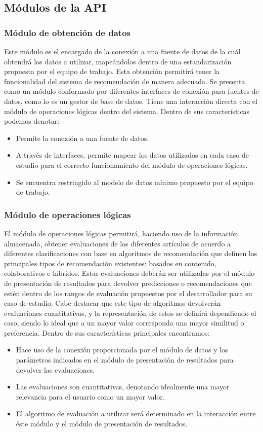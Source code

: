 \subsection{Módulos de la API}
  \subsubsection{Módulo de obtención de datos}
    Este módulo es el encargado de la conexión a una fuente de datos de la cuál obtendrá los datos a utilizar, mapeándolos dentro de una estandarización propuesta por el equipo de trabajo. Esta obtención permitirá tener la funcionalidad del sistema de recomendación de manera adecuada. 
    Se presenta como un módulo conformado por diferentes interfaces de conexión para fuentes de datos, como lo es un gestor de base de datos. Tiene una interacción directa con el módulo de operaciones lógicas dentro del sistema.
    Dentro de sus características podemos denotar:
    \begin{itemize}
      \item Permite la conexión a una fuente de datos.
      \item A través de interfaces, permite mapear los datos utilizados en cada caso de estudio para el correcto funcionamiento del módulo de operaciones lógicas.
      \item Se encuentra restringido al modelo de datos mínimo propuesto por el equipo de trabajo.
    \end{itemize}

  \subsubsection{Módulo de operaciones lógicas}
    El módulo de operaciones lógicas permitirá, haciendo uso de la información almacenada, obtener evaluaciones de los diferentes artículos de acuerdo a diferentes clasificaciones con base en algoritmos de recomendación que definen los principales tipos de recomendación existentes: basados en contenido, colaborativos e híbridos. Estas evaluaciones deberán ser utilizadas por el módulo de presentación de resultados para devolver predicciones o recomendaciones que estén dentro de los rangos de evaluación propuestos por el desarrollador para su caso de estudio. Cabe destacar que este tipo de algoritmos devolverán evaluaciones cuantitativas, y la representación de estos se definirá dependiendo el caso, siendo lo ideal que a un mayor valor corresponda una mayor similitud o preferencia. Dentro de sus características principales encontramos:
    \begin{itemize}
      \item Hace uso de la conexión proporcionada por el módulo de datos y los parámetros indicados en el módulo de presentación de resultados para devolver las evaluaciones.
      \item Las evaluaciones son cuantitativas, denotando idealmente una mayor relevancia para el usuario como un mayor valor.
      \item El algoritmo de evaluación a utilizar será determinado en la interacción entre éste módulo y el módulo de presentación de resultados.
    \end{itemize}

